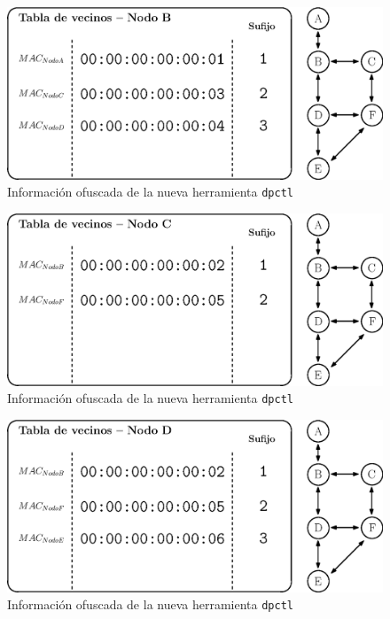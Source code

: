 \begin{figure}[ht!]
    \centering
    \includegraphics[width=\textwidth]{archivos/img/dev/topo_hello_nodoB_nb.eps}
    \caption{Información ofuscada de la nueva herramienta \texttt{dpctl}}
    \label{fig:topo_hello_nodoB_nb}
\end{figure}

\begin{figure}[ht!]
    \centering
    \includegraphics[width=\textwidth]{archivos/img/dev/topo_hello_nodoC_nb.eps}
    \caption{Información ofuscada de la nueva herramienta \texttt{dpctl}}
    \label{fig:topo_hello_nodoC_nb}
\end{figure}


\begin{figure}[ht!]
    \centering
    \includegraphics[width=\textwidth]{archivos/img/dev/topo_hello_nodoD_nb.eps}
    \caption{Información ofuscada de la nueva herramienta \texttt{dpctl}}
    \label{fig:topo_hello_nodoD_nb}
\end{figure}


